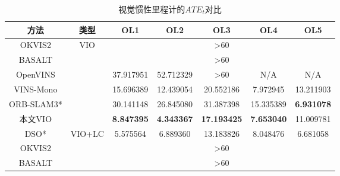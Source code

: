 \begin{table}
\centering
\begin{threeparttable}
\caption{视觉惯性里程计的$ATE_t$\textdownarrow{}对比}
\begin{tabular}{c|c|ccccc}
\toprule
方法 & 类型           & OL1 & OL2 & OL3 & OL4 & OL5 \\ \midrule
OKVIS2          & \multirow{6}{*}{VIO}    & \multicolumn{5}{c}{\textgreater{}60}                       \\
BASALT          &                         & \multicolumn{5}{c}{\textgreater{}60}                       \\
OpenVINS        &                         & 37.917951                                & 52.712329                                & {\textgreater{}60}                               & N/A                                      & N/A                                      \\
VINS-Mono       &                         & 15.696389                                & 12.439054                                &20.552186                                & 7.972945                                 & 13.211903                                \\
ORB-SLAM3*       &                         & 30.141148                                & 26.845080                                & 31.387398                                & 15.335389                                & \cellcolor[HTML]{FA7F6F}\textbf{6.931078}                                 \\
本文VIO            &                         & \cellcolor[HTML]{FA7F6F}\textbf{8.847395}                                 & \cellcolor[HTML]{FA7F6F}\textbf{4.343367}                                 &  \cellcolor[HTML]{FA7F6F}\textbf{17.193425}                                & \cellcolor[HTML]{FA7F6F}\textbf{7.653040}                                 & 11.009781                                \\ \midrule
DSO*         & \multirow{7}{*}{VIO+LC} & 5.575564                                 & 6.889360                                 & 13.183826                                & 8.048476                                 & 6.681058                                 \\
OKVIS2          &                         & \multicolumn{5}{c}{\textgreater{}60}                         \\
BASALT          &                         & \multicolumn{5}{c}{\textgreater{}60}                         \\

\end{tabular}
\end{threeparttable}
\end{table}
